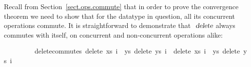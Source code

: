 Recall from Section~\ref{sect.ops.commute} that in order to prove the convergence theorem we need to show that for the datatype in question, all its concurrent operations commute.
It is straightforward to demonstrate that $\isa{delete}$ always commutes with itself, on concurrent and non-concurrent operations alike:
\vspace{0.275em}
\begin{isabellebody}
\ \ \ \ \ \ \ \ \ delete{\isacharunderscore}commutes{\isacharcolon}\ {\isachardoublequoteopen}delete\ xs\ i{}\ {\isasymbind}\ {\isacharparenleft}{\isasymlambda}ys{\isachardot}\ delete\ ys\ i{}{\isacharparenright}\ {\isacharequal}\ delete\ xs\ i{}\ {\isasymbind}\ {\isacharparenleft}{\isasymlambda}ys{\isachardot}\ delete\ ys\ i{}{\isacharparenright}{\isachardoublequoteclose}
\end{isabellebody}
\vspace{0.275em}

